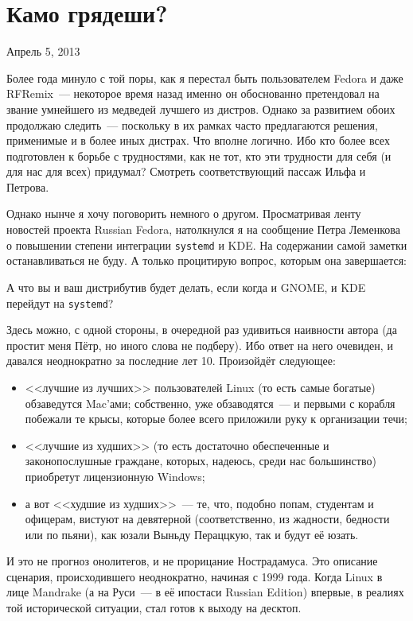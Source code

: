 \section{Камо грядеши?} 
\begin{timeline}Апрель 5, 2013\end{timeline}

Более года минуло с той поры, как я перестал быть пользователем Fedora и даже RFRemix~--- некоторое время назад  именно он обоснованно претендовал на звание умнейшего из медведей лучшего из дистров. Однако за развитием обоих продолжаю следить~--- поскольку в их рамках часто предлагаются решения, применимые и в более иных дистрах. Что вполне логично. Ибо кто более всех подготовлен к борьбе с трудностями, как не тот, кто эти трудности для себя (и для нас для всех) придумал? Смотреть соответствующий пассаж Ильфа и Петрова.

Однако нынче я хочу поговорить немного о другом. Просматривая ленту новостей проекта Russian Fedora, натолкнулся я на сообщение Петра Леменкова о повышении степени интеграции \texttt{systemd} и KDE. На содержании самой заметки останавливаться не буду. А только процитирую вопрос, которым она завершается:
\begin{shadequote}{}
А что вы и ваш дистрибутив будет делать, если когда и GNOME, и KDE перейдут на \texttt{systemd}?
\end{shadequote}
Здесь можно, с одной стороны, в очередной раз удивиться наивности автора (да простит меня Пётр, но иного слова не подберу). Ибо ответ на него очевиден, и давался неоднократно за последние лет 10. Произойдёт следующее:

\begin{itemize}
	\item <<лучшие из лучших>> пользователей Linux (то есть самые богатые) обзаведутся Mac'ами; собственно, уже обзаводятся~--- и первыми с корабля побежали те крысы, которые более всего приложили руку к организации течи; 
	\item <<лучшие из худших>> (то есть достаточно обеспеченные и законопослушные граждане, которых, надеюсь, среди нас большинство) приобретут лицензионную Windows;
	\item а вот <<худшие из худших>>~--- те, что, подобно попам, студентам и офицерам, вистуют на девятерной (соответственно, из жадности, бедности или по пьяни), как юзали Выньду Пераццкую, так и будут её юзать.
\end{itemize}

И это не прогноз онолитегов, и не прорицание Нострадамуса. Это описание сценария, происходившего неоднократно, начиная с 1999 года. Когда Linux в лице Mandrake (а на Руси~--- в её ипостаси Russian Edition) впервые, в реалиях той исторической ситуации, стал готов к выходу на десктоп.

